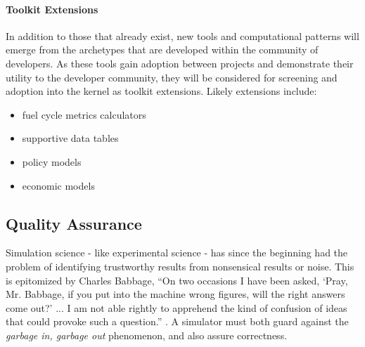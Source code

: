 \paragraph{Toolkit Extensions}

In addition to those that already exist, new tools and computational patterns will 
emerge from the archetypes that are developed within the community of 
developers. As these tools gain adoption between projects and demonstrate their 
utility to the developer community, they will be considered for screening and 
adoption into the kernel as toolkit extensions. Likely extensions include:

\begin{itemize}
\item fuel cycle metrics calculators
\item supportive data tables
\item policy models
\item economic models
\end{itemize}

\subsection{Quality Assurance}
%

%


Simulation science - like experimental science - has since the beginning had the 
problem of identifying trustworthy results from nonsensical results or noise.
This is epitomized by Charles Babbage, ``On two occasions I have been asked, 
`Pray, Mr. Babbage, if you put into the machine wrong figures, will the right 
answers come out?' ... I am not able rightly to apprehend the kind of confusion 
of ideas that could provoke such a question.'' \cite{babbage_passages_2011}. 
A simulator must both guard against the \emph{garbage in, garbage out} phenomenon, and also assure correctness.


